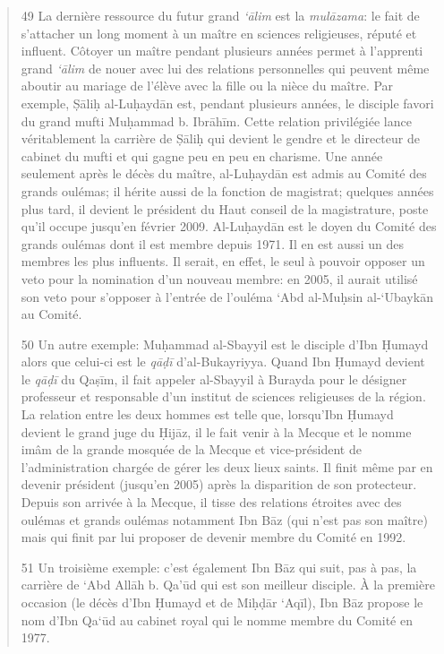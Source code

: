 \begin{quote}
49 La dernière ressource du futur grand \emph{`ālim} est la
\emph{mulāzama}: le fait de s'attacher un
long moment à un maître en sciences religieuses, réputé et influent.
Côtoyer un maître pendant plusieurs années permet à l'apprenti grand
\emph{`ālim} de nouer avec lui des relations personnelles qui peuvent
même aboutir au mariage de l'élève avec la fille ou la nièce du maître.
Par exemple, Ṣāliḥ al-Luḥaydān est, pendant plusieurs années, le
disciple favori du grand mufti Muḥammad b. Ibrāhīm. Cette relation
privilégiée lance véritablement la carrière de Ṣāliḥ qui devient le
gendre et le directeur de cabinet du mufti et qui gagne peu en peu en
charisme. Une année seulement après le décès du maître, al-Luḥaydān est
admis au Comité des grands oulémas; il hérite aussi de la fonction de
magistrat; quelques années plus tard, il devient le président du Haut
conseil de la magistrature, poste qu'il occupe jusqu'en février 2009.
Al-Luḥaydān est le doyen du Comité des grands oulémas dont il est membre
depuis 1971. Il en est aussi un des membres les plus influents. Il
serait, en effet, le seul à pouvoir opposer un veto pour la nomination
d'un nouveau membre: en 2005, il aurait utilisé son veto pour s'opposer
à l'entrée de l'ouléma `Abd al-Muḥsin al-`Ubaykān au Comité.

50 Un autre exemple: Muḥammad al-Sbayyil est le disciple d'Ibn Ḥumayd
alors que
celui-ci est le \emph{qāḍī} d'al-Bukayriyya. Quand Ibn Ḥumayd devient le
\emph{qāḍī} du Qaṣīm, il fait appeler al-Sbayyil à Burayda pour le
désigner professeur et responsable d'un institut de sciences religieuses
de la région. La relation entre les deux hommes est telle que,
lorsqu'Ibn Ḥumayd devient le grand juge du Ḥijāz, il le fait venir à la
Mecque et le nomme imâm de la grande mosquée de la Mecque et
vice-président de l'administration chargée de gérer les deux lieux
saints. Il finit même par en devenir président (jusqu'en 2005) après la
disparition de son protecteur. Depuis son arrivée à la Mecque, il tisse
des
relations étroites avec des oulémas et grands oulémas notamment Ibn Bāz
(qui n'est pas son maître) mais qui finit par lui proposer de devenir
membre du Comité en 1992.

51 Un troisième exemple: c'est également Ibn Bāz qui suit, pas à pas, la
carrière de `Abd
Allāh b. Qa'ūd qui est son meilleur disciple. À la première occasion (le
décès d'Ibn Ḥumayd et de Miḥḍār `Aqīl), Ibn Bāz propose le nom d'Ibn
Qa`ūd au cabinet royal qui le nomme membre du Comité en 1977.


\end{quote}
